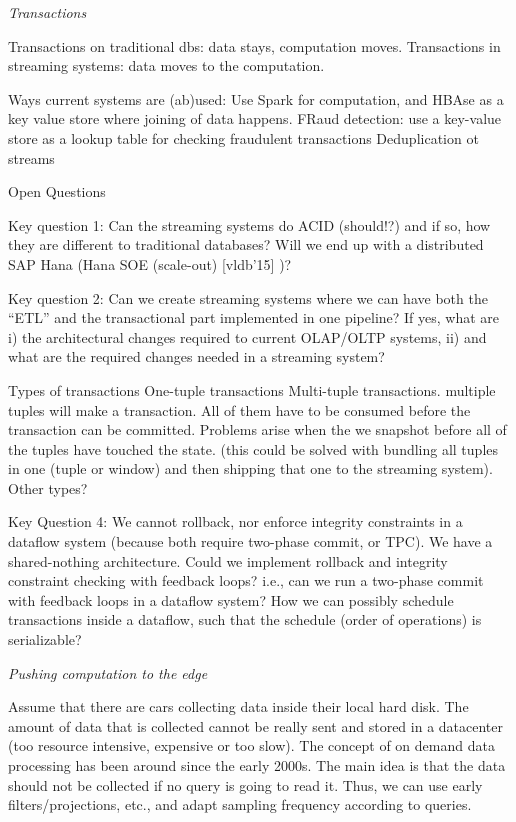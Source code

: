 \emph{Transactions}


Transactions on traditional dbs: data stays, computation moves. 
Transactions in streaming systems: data moves to the computation.

Ways current systems are (ab)used:
Use Spark for computation, and HBAse as a key value store where joining of data happens.
FRaud detection: use a key-value store as a lookup table for checking fraudulent transactions
Deduplication ot streams

Open Questions

Key question 1: Can the streaming systems do ACID (should!?) and if so, how they are different to traditional databases? Will we end up with a distributed SAP Hana (Hana SOE (scale-out) [vldb’15] )?

Key question 2: Can we create streaming systems where we can have both the “ETL” and the transactional part implemented in one pipeline? If yes, what are i) the architectural changes required to current OLAP/OLTP systems, ii) and what are the required changes needed in a streaming system?


Types of transactions
One-tuple transactions
Multi-tuple transactions. multiple tuples will make a transaction. All of them have to be consumed before the transaction can be committed. Problems arise when the we snapshot before all of the tuples have touched the state. (this could be solved with bundling all tuples in one (tuple or window) and then shipping that one to the streaming system).
Other types?


Key Question 4: We cannot rollback, nor enforce integrity constraints in a dataflow system (because both require two-phase commit, or TPC). We have a shared-nothing architecture. Could we implement rollback and integrity constraint checking with feedback loops? i.e., can we run a two-phase commit with feedback loops in a dataflow system? How we can possibly schedule transactions inside a dataflow, such that the schedule (order of operations) is serializable?

\emph{Pushing computation to the edge}

Assume that there are cars collecting data inside their local hard disk. The amount of data that is collected cannot be really sent and stored in a datacenter (too resource intensive, expensive or too slow). The concept of on demand data processing has been around since the early 2000s. The main idea is that the data should not be collected if no query is going to read it. Thus, we can use early filters/projections, etc., and adapt sampling frequency according to queries. 

